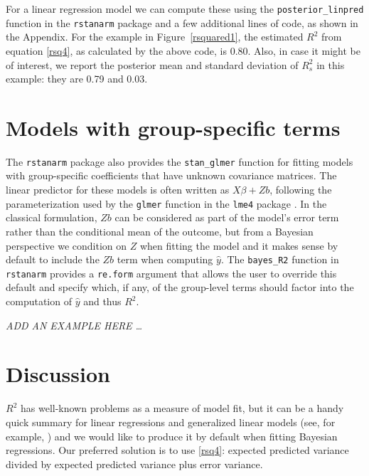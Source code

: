 \documentclass[11pt]{article}
\begin{document}


For a linear regression model we can compute these using the \verb#posterior_linpred# function in the {\tt rstanarm}
package and a few additional lines of code, as shown in the Appendix.
For the example in Figure~\ref{rsquared1}, the estimated $R^2$ from
equation \eqref{rsq4}, as calculated by the above code, is 0.80.
Also, in case it might be of interest, we
report the posterior mean and standard deviation of $R^2_s$ in this example:
they are 0.79 and 0.03.

\section{Models with group-specific terms}
The {\tt rstanarm} package also provides the \verb#stan_glmer# function for
fitting models with group-specific coefficients that have unknown covariance
matrices. The linear predictor for these models is often written as
$X \beta + Zb$, following the parameterization used by the \verb#glmer#
function in the {\tt lme4} package \citep{lme4Rpackage}. In the classical
formulation, $Zb$ can be considered as part of the model's error term rather than
the conditional mean of the outcome, but from a Bayesian perspective we
condition on $Z$ when fitting the model and it makes sense by default to include
the $Zb$ term when computing $\hat{y}$. The \verb#bayes_R2# function in
{\tt rstanarm} provides a {\tt re.form} argument that allows the user to
override this default and specify which, if any, of the group-level terms should
factor into the computation of $\hat{y}$ and thus $R^2$.

{\em ADD AN EXAMPLE HERE \dots}

\section{Discussion}
$R^2$ has well-known problems as a measure of model fit, but it can be a handy
quick summary for linear regressions and generalized linear models (see, for
example, \cite{HuPaltaShao2006}) and we would like to produce it by default
when fitting Bayesian regressions.  Our preferred solution is to use \eqref{rsq4}:  expected predicted variance divided by
expected predicted variance plus error variance.
\end{document}
